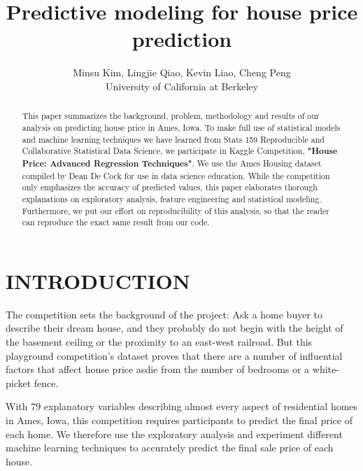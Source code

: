 \documentclass[letterpaper, 10 pt, conference]{ieeeconf}\usepackage[]{graphicx}\usepackage[]{color}
\title{\LARGE \bf
Predictive modeling for house price prediction
}
\author{Minsu Kim, Lingjie Qiao, Kevin Liao, Cheng Peng \\
University of California at Berkeley} %
\begin{document}
\maketitle
\thispagestyle{empty}
\pagestyle{empty}


\begin{abstract}

This paper summarizes the background, problem, methodology and results of our analysis on predicting house price in Ames, Iowa. To make full use of statistical models and machine learning techniques we have learned from Stats 159 Reproducible and Collaborative Statistical Data Science, we participate in Kaggle Competition, \textbf{"House Price: Advanced Regression Techniques"}. We use the Ames Housing dataset compiled by Dean De Cock for use in data science education. While the competition only emphasizes the accuracy of predicted values, this paper elaborates thorough explanations on exploratory analysis, feature engineering and statistical modeling. Furthermore, we put our effort on reproducibility of this analysis, so that the reader can reproduce the exact same result from our code.

\end{abstract}


\section{INTRODUCTION}

The competition sets the background of the project: Ask a home buyer to describe their dream house, and they probably do not begin with the height of the basement ceiling or the proximity to an east-west railroad. But this playground competition's dataset proves that there are a number of influential factors that affect house price asdie from the number of bedrooms or a white-picket fence. 

With 79 explanatory variables describing almost every aspect of residential homes in Ames, Iowa, this competition requires participants to predict the final price of each home. We therefore use the exploratory analysis and experiment different machine learning techniques to accurately predict the final sale price of each house.
\end{document}
